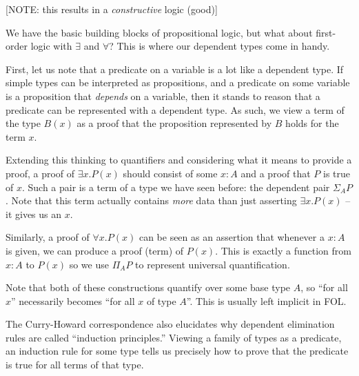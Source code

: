 [NOTE: this results in a \emph{constructive} logic (good)]

We have the basic building blocks of propositional logic, but what about
first-order logic with $\exists$ and $\forall$? This is where our dependent
types come in handy.

First, let us note that a predicate on a variable is a lot like a dependent
type. If simple types can be interpreted as propositions, and a predicate on
some variable is a proposition that \emph{depends} on a variable, then it stands
to reason that a predicate can be represented with a dependent type. As such, we
view a term of the type $B(x)$ as a proof that the proposition represented by
$B$ holds for the term $x$.

Extending this thinking to quantifiers and considering what it means to provide
a proof, a proof of $\exists x. P(x)$ should consist of some $x:A$ and a proof
that $P$ is true of $x$. Such a pair is a term of a type we have seen before:
the dependent pair $\Sigma_A P$. Note that this term actually contains
\emph{more} data than just asserting $\exists x. P(x)$ -- it gives us an $x$.

Similarly, a proof of $\forall x. P(x)$ can be seen as an assertion that
whenever a $x:A$ is given, we can produce a proof (term) of $P(x)$. This is
exactly a function from $x:A$ to $P(x)$ so we use $\Pi_A P$ to represent universal
quantification.

Note that both of these constructions quantify over some base type $A$, so ``for
all $x$'' necessarily becomes ``for all $x$ of type $A$''. This is usually left
implicit in FOL.

The Curry-Howard correspondence also elucidates why dependent elimination rules
are called ``induction principles.'' Viewing a family of types as a predicate,
an induction rule for some type tells us precisely how to prove that the
predicate is true for all terms of that type.
